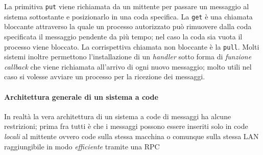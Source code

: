 La primitiva \texttt{put} viene richiamata da un mittente per passare un messaggio al sistema sottostante e posizionarlo in una coda specifica. La \texttt{get} è una chiamata bloccante attraverso la quale un processo autorizzato può rimuovere dalla coda specificata il messaggio pendente da più tempo; nel caso la coda sia vuota il processo viene bloccato. La corrispettiva chiamata non bloccante è la \texttt{pull}.
Molti sistemi inoltre permettono l'installazione di un \emph{handler} sotto forma di \emph{funzione callback} che viene richiamata all'arrivo di ogni nuovo messaggio; molto utili nel caso si volesse avviare un processo per la ricezione dei messaggi.
\paragraph{Architettura generale di un sistema a code}
In realtà la vera architettura di un sistema a code di messaggi ha alcune restrizioni; prima fra tutti è che i messaggi possono essere inseriti solo in code \emph{locali} al mittente ovvero code sulla stessa macchina o comunque sulla stessa LAN raggiungibile in modo \emph{efficiente} tramite una RPC